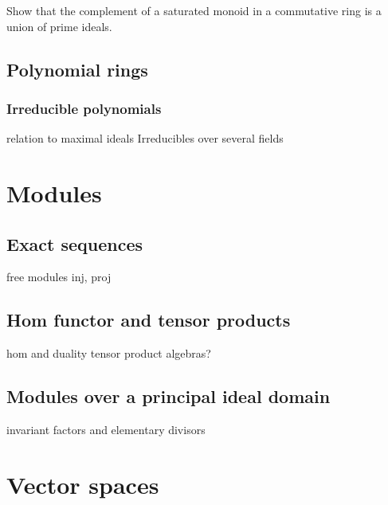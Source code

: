 \documentclass{../note}
\begin{document}
\begin{prb}
Show that the complement of a saturated monoid in a commutative ring is a union of prime ideals.
\end{prb}


\chapter{Polynomial rings}
\section{Irreducible polynomials}
relation to maximal ideals
Irreducibles over several fields













\part{Modules}

\chapter{Exact sequences}
free modules
inj, proj

\chapter{Hom functor and tensor products}
hom and duality
tensor product
algebras?

\chapter{Modules over a principal ideal domain}
invariant factors and elementary divisors

















\part{Vector spaces}


\chapter{}
\end{document}
